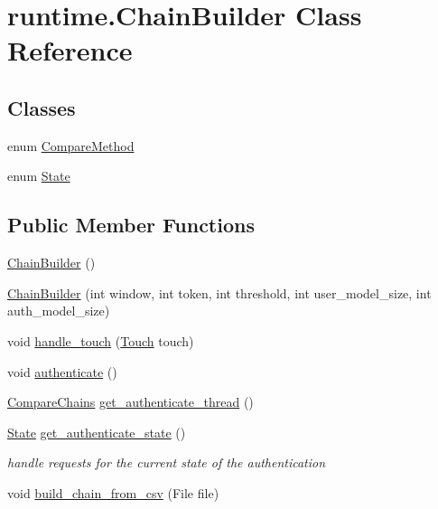 \hypertarget{classruntime_1_1_chain_builder}{}\section{runtime.\+Chain\+Builder Class Reference}
\label{classruntime_1_1_chain_builder}
\subsection*{Classes}
\begin{DoxyCompactItemize}
\item 
enum \hyperlink{enumruntime_1_1_chain_builder_1_1_compare_method}{Compare\+Method}
\item 
enum \hyperlink{enumruntime_1_1_chain_builder_1_1_state}{State}
\end{DoxyCompactItemize}
\subsection*{Public Member Functions}
\begin{DoxyCompactItemize}
\item 
\hyperlink{classruntime_1_1_chain_builder_af43032940c67edb1efd6539d1e560881}{Chain\+Builder} ()
\item 
\hyperlink{classruntime_1_1_chain_builder_a99fd0c70e205e8117d1dc1cf07fed8a7}{Chain\+Builder} (int window, int token, int threshold, int user\+\_\+model\+\_\+size, int auth\+\_\+model\+\_\+size)
\item 
void \hyperlink{classruntime_1_1_chain_builder_a4f42e44cba506f6ad523acb85c68701e}{handle\+\_\+touch} (\hyperlink{classcomponents_1_1_touch}{Touch} touch)
\item 
void \hyperlink{classruntime_1_1_chain_builder_aa483e6832f09092ec52fdf715e6f4b5e}{authenticate} ()
\item 
\hyperlink{classruntime_1_1_compare_chains}{Compare\+Chains} \hyperlink{classruntime_1_1_chain_builder_afec27831c01ad10069232680b82b3298}{get\+\_\+authenticate\+\_\+thread} ()
\item 
\hyperlink{enumruntime_1_1_chain_builder_1_1_state}{State} \hyperlink{classruntime_1_1_chain_builder_ab01b027d8ad763c58fef515f6bdfe03d}{get\+\_\+authenticate\+\_\+state} ()
\begin{DoxyCompactList}\small\item\em handle requests for the current state of the authentication \end{DoxyCompactList}\item 
void \hyperlink{classruntime_1_1_chain_builder_aac13171465eedc1e37a39f740d44b3af}{build\+\_\+chain\+\_\+from\+\_\+csv} (File file)
\end{DoxyCompactItemize}
